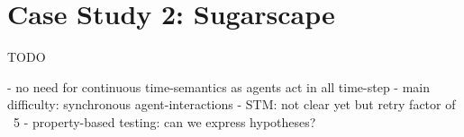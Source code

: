 \section{Case Study 2: Sugarscape}
TODO

- no need for continuous time-semantics as agents act in all time-step
- main difficulty: synchronous agent-interactions
- STM: not clear yet but retry factor of ~5
- property-based testing: can we express hypotheses?